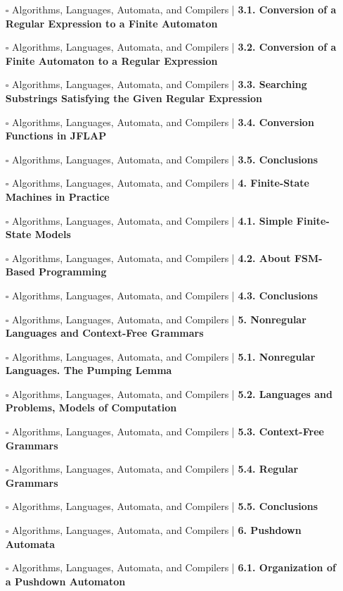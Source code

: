 \documentclass[a4, landscape, 12pt]{article}
\newcommand{\checkbox}{$\square$}%
\begin{document}
\begin{itemize}
{Automata and Regular Expressions
}
\item [\checkbox]  Algorithms, Languages, Automata, and Compilers | \textbf{ 3.1. Conversion of a Regular 
Expression to a Finite Automaton
}
\item [\checkbox]  Algorithms, Languages, Automata, and Compilers | \textbf{ 3.2. Conversion of a Finite Automaton to a Regular Expression
}
\item [\checkbox]  Algorithms, Languages, Automata, and Compilers | \textbf{ 3.3. Searching Substrings Satisfying the Given Regular Expression
}
\item [\checkbox]  Algorithms, Languages, Automata, and Compilers | \textbf{ 3.4. Conversion Functions in JFLAP
}
\item [\checkbox]  Algorithms, Languages, Automata, and Compilers | \textbf{ 3.5. Conclusions
}
\item [\checkbox]  Algorithms, Languages, Automata, and Compilers | \textbf{ 4. Finite-State Machines in Practice
}
\item [\checkbox]  Algorithms, Languages, Automata, and Compilers | \textbf{ 4.1. Simple Finite-State Models
}
\item [\checkbox]  Algorithms, Languages, Automata, and Compilers | \textbf{ 4.2. About FSM-Based Programming
}
\item [\checkbox]  Algorithms, Languages, Automata, and Compilers | \textbf{ 4.3. Conclusions
}
\item [\checkbox]  Algorithms, Languages, Automata, and Compilers | \textbf{ 5. Nonregular Languages and Context-Free Grammars
}
\item [\checkbox]  Algorithms, Languages, Automata, and Compilers | \textbf{ 5.1. Nonregular Languages. The Pumping Lemma
}
\item [\checkbox]  Algorithms, Languages, Automata, and Compilers | \textbf{ 5.2. Languages and Problems, Models of Computation
}
\item [\checkbox]  Algorithms, Languages, Automata, and Compilers | \textbf{ 5.3. Context-Free Grammars
}
\item [\checkbox]  Algorithms, Languages, Automata, and Compilers | \textbf{ 5.4. Regular Grammars
}
\item [\checkbox]  Algorithms, Languages, Automata, and Compilers | \textbf{ 5.5. Conclusions
}
\item [\checkbox]  Algorithms, Languages, Automata, and Compilers | \textbf{ 6. Pushdown Automata
}
\item [\checkbox]  Algorithms, Languages, Automata, and Compilers | \textbf{ 6.1. Organization of a Pushdown Automaton
}
\end{itemize}
\end{document}
